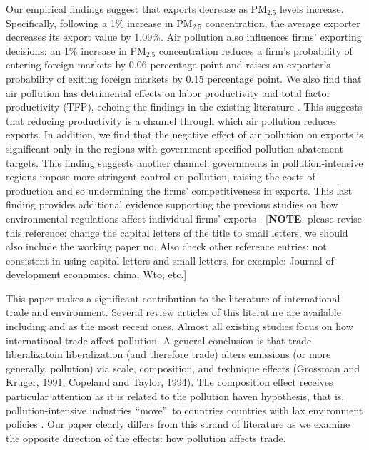 \documentclass[12pt]{article}
\begin{document}
Our empirical findings suggest that exports decrease as $\mathrm{PM_{2.5}}$
levels increase. Specifically, following a 1\% increase in $\mathrm{PM_{2.5}}
$ concentration, the average exporter decreases its export value by 1.09\%.
Air pollution also influences firms' exporting decisions: an 1\% increase in 
$\mathrm{PM_{2.5}}$ concentration reduces a firm's probability of entering
foreign markets by 0.06 percentage point and raises an exporter's
probability of exiting foreign markets by 0.15 percentage point. We also
find that air pollution has detrimental effects on labor productivity and
total factor productivity (TFP), echoing the findings in the existing
literature \citep{greenstone2012effects,fu2021air,khanna2021productivity}.
This suggests that reducing productivity is a channel through which air
pollution reduces exports. In addition, we find that the negative effect of
air pollution on exports is significant only in the regions with
government-specified pollution abatement targets. This finding suggests
another channel: governments in pollution-intensive regions impose more
stringent control on pollution, raising the costs of production and so
undermining the firms' competitiveness in exports. This last finding
provides additional evidence supporting the previous studies on how
environmental regulations affect individual firms' exports %
\citep{cherniwchan2022international}. [\textbf{NOTE}: please revise this
reference: change the capital letters of the title to small letters. we
should also include the working paper no. Also check other reference
entries: not consistent in using capital letters and small letters, for
example: Journal of development economics. china, Wto, etc.]

This paper makes a significant contribution to the literature of
international trade and environment. Several review articles of this
literature are available including \cite{cherniwchan2017trade} and \cite%
{cherniwchan2022international} as the most recent ones. Almost all existing
studies focus on how international trade affect pollution. A general
conclusion is that trade \sout{liberalizatoin} liberalization (and therefore trade) alters
emissions (or more generally, pollution) via scale, composition, and
technique effects (Grossman and Kruger, 1991; Copeland and Taylor, 1994).
The composition effect receives particular attention as it is related to the
pollution haven hypothesis, that is, pollution-intensive industries
\textquotedblleft move\textquotedblright\ to countries countries with lax
environment policies \citep{copeland1994north,taylor2005unbundling}. Our
paper clearly differs from this strand of literature as we examine the
opposite direction of the effects: how pollution affects trade.
\end{document}
